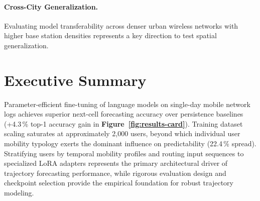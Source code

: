 \paragraph{Cross-City Generalization.} Evaluating model transferability across denser urban wireless networks with higher base station densities represents a key direction to test spatial generalization.

\section{Executive Summary}

Parameter-efficient fine-tuning of language models on single-day mobile network logs achieves superior next-cell forecasting accuracy over persistence baselines (+4.3\,\% top-1 accuracy gain in \textbf{Figure~\ref{fig:results-card}}). Training dataset scaling saturates at approximately 2,000 users, beyond which individual user mobility typology exerts the dominant influence on predictability (22.4\,\% spread). Stratifying users by temporal mobility profiles and routing input sequences to specialized LoRA adapters represents the primary architectural driver of trajectory forecasting performance, while rigorous evaluation design and checkpoint selection provide the empirical foundation for robust trajectory modeling.

